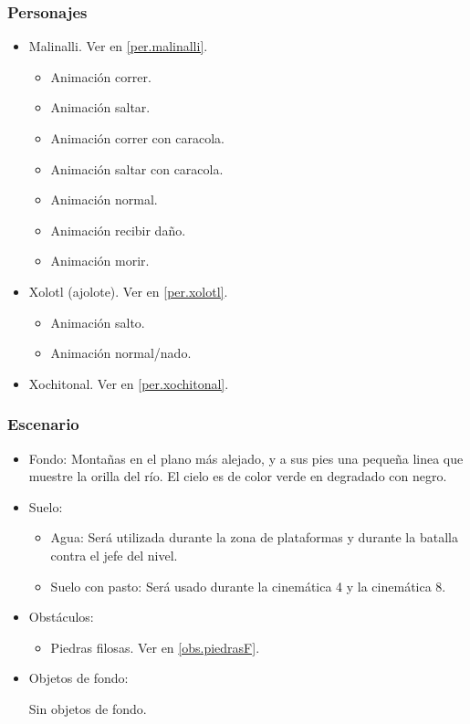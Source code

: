 \documentclass[11pt,letterpaper]{article}
\begin{document}
	\subsubsection{Personajes}
	\begin{itemize}
		\item Malinalli. Ver en \ref{per.malinalli}.
		\begin{itemize}
			\item Animación correr.
			\item Animación saltar.
			\item Animación correr con caracola.
			\item Animación saltar con caracola.
			\item Animación normal.
			\item Animación recibir daño.
			\item Animación morir.
		\end{itemize}
		\item Xolotl (ajolote). Ver en \ref{per.xolotl}.
			\begin{itemize}
				\item Animación salto.
				\item Animación normal/nado.
			\end{itemize}
		\item Xochitonal. Ver en \ref{per.xochitonal}.
	\end{itemize}
	
\subsubsection{Escenario}
\begin{itemize} 
	\item Fondo:
Montañas en el plano más alejado, y a sus pies una pequeña linea que muestre la orilla del río. El cielo es de color verde en degradado con negro.
	\item Suelo:
		\begin{itemize}
			\item Agua: Será utilizada durante la zona de plataformas y durante la batalla contra el jefe del nivel.
			\item Suelo con pasto: Será usado durante la cinemática 4 y la cinemática 8.
		\end{itemize}
	\item Obstáculos:
		\begin{itemize}
			\item Piedras filosas. Ver en \ref{obs.piedrasF}.				
		\end{itemize}
	\item Objetos de fondo: 
	\\
	\par	
	Sin objetos de fondo.
	
\end{itemize}	
	
\end{document}
